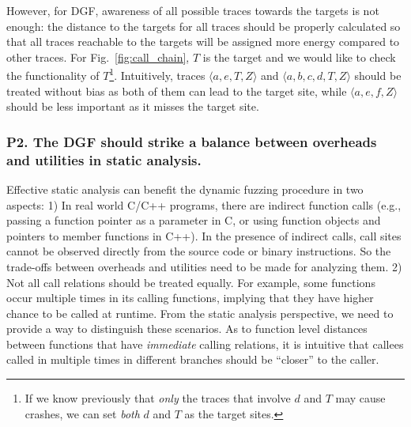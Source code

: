However, for DGF, awareness of all possible traces towards the targets is not enough: the distance to the targets for all traces should be properly calculated so that all traces reachable to the targets will be assigned more energy compared to other traces. For Fig.~\ref{fig:call_chain}, $T$ is the target and we would like to check the functionality of $T$\footnote{If we know previously that \emph{only} the traces that involve $d$ and $T$ may cause crashes, we can set \emph{both} $d$ and $T$ as the target sites.}. Intuitively, traces $ \langle a, e, T, Z\rangle$ and $\langle a, b, c, d, T, Z\rangle$ should be treated without bias as both of them can lead to the target site, while $ \langle a, e, f , Z\rangle$ should be less important as it misses the target site. 



\subsubsection{\textbf{P2}. The DGF should strike a \textbf{balance} between overheads and utilities in static analysis.}\label{subsec:p2}  Effective static analysis can benefit the dynamic fuzzing procedure in two aspects: 1) In real world C/C++ programs, there are indirect function calls (e.g., passing a function pointer as a parameter in C, or using function objects and pointers to member functions in C++). In the presence of indirect calls, call sites cannot be observed directly from the source code or binary instructions. So the trade-offs between overheads and utilities need to be made for analyzing them. 2) Not all call relations should be treated equally. For example, some functions occur multiple times in its calling functions, implying  that they have higher chance to be called at runtime. From the static analysis perspective, we need to provide a way to distinguish these scenarios. As to function level distances between functions that have \emph{immediate} calling relations, it is intuitive that callees called in multiple times in different branches should be ``closer'' to the caller.


